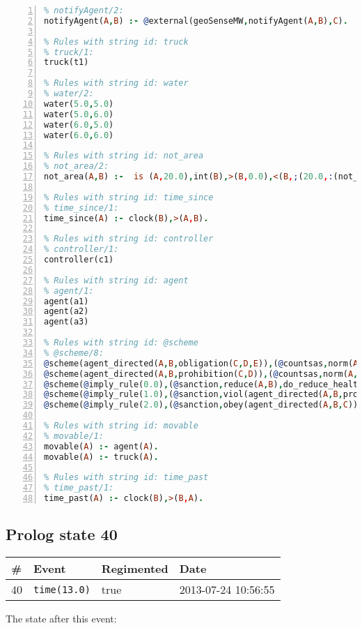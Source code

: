 \documentclass[11pt]{article}\usepackage[utf8]{inputenc}\usepackage{geometry}
\begin{document}
\begin{lstlisting}[language=Prolog, numbers=left]
% Rules with string id: notifyAgent
% notifyAgent/2:
notifyAgent(A,B) :- @external(geoSenseMW,notifyAgent(A,B),C).

% Rules with string id: truck
% truck/1:
truck(t1)

% Rules with string id: water
% water/2:
water(5.0,5.0)
water(5.0,6.0)
water(6.0,5.0)
water(6.0,6.0)

% Rules with string id: not_area
% not_area/2:
not_area(A,B) :-  is (A,20.0),int(B),>(B,0.0),<(B,;(20.0,:(not_area(A,B), is (-(B),20.0)))),int(A),>(A,0.0),<(A,;(20.0,:(area(A,B),-(int(A))))),int(B),>(A,0.0),>(B,0.0),<(A,21.0),<(B,21.0).

% Rules with string id: time_since
% time_since/1:
time_since(A) :- clock(B),>(A,B).

% Rules with string id: controller
% controller/1:
controller(c1)

% Rules with string id: agent
% agent/1:
agent(a1)
agent(a2)
agent(a3)

% Rules with string id: @scheme
% @scheme/8:
@scheme(agent_directed(A,B,obligation(C,D,E)),(@countsas,norm(A,B,F,obligation(C,D,E)),F),false,(listTrue(C)),(time_past(D)),false,[plus(viol(agent_directed(A,B,obligation(C,D,E))))|[]],[plus(obey(agent_directed(A,B,obligation(C,D,E))))|[]])
@scheme(agent_directed(A,B,prohibition(C,D)),(@countsas,norm(A,B,E,prohibition(C,D)),E),(listTrue(C)),false,(false),false,[plus(viol(agent_directed(A,B,prohibition(C,D))))|[]],[plus(obey(agent_directed(A,B,prohibition(C,D))))|[]])
@scheme(@imply_rule(0.0),(@sanction,reduce(A,B),do_reduce_health(A,B),notifyAgent(A,changed(status))),true,false,false,false,[min(reduce(A,B))|[]],[])
@scheme(@imply_rule(1.0),(@sanction,viol(agent_directed(A,B,prohibition(C,D))),do_sanction(D)),true,false,false,false,[min(viol(agent_directed(A,B,prohibition(C,D))))|[]],[])
@scheme(@imply_rule(2.0),(@sanction,obey(agent_directed(A,B,C))),true,false,false,false,[min(obey(agent_directed(A,B,C)))|[]],[])

% Rules with string id: movable
% movable/1:
movable(A) :- agent(A).
movable(A) :- truck(A).

% Rules with string id: time_past
% time_past/1:
time_past(A) :- clock(B),>(B,A).

\end{lstlisting}
\clearpage 
\subsection{Prolog state 40}
\begin{table}[ht]
\centering 
\begin{tabular}{l l l l} 
\textbf{\#} & \textbf{Event} & \textbf{Regimented} & \textbf{Date} \\ [0.5ex] 
\hline
40&\texttt{time(13.0)}&true&2013-07-24 10:56:55\\ [1ex] \hline\end{tabular}
\end{table}
The state after this event:
\end{document}
